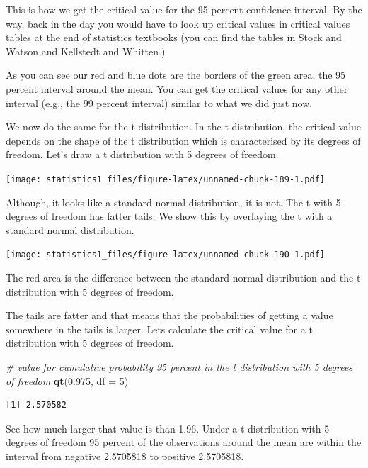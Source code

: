 \documentclass[]{article}
\newenvironment{Shaded}{\begin{snugshade}}{\end{snugshade}}
\newcommand{\KeywordTok}[1]{\textcolor[rgb]{0.13,0.29,0.53}{\textbf{#1}}}
\newcommand{\DataTypeTok}[1]{\textcolor[rgb]{0.13,0.29,0.53}{#1}}
\newcommand{\DecValTok}[1]{\textcolor[rgb]{0.00,0.00,0.81}{#1}}
\newcommand{\FloatTok}[1]{\textcolor[rgb]{0.00,0.00,0.81}{#1}}
\newcommand{\CommentTok}[1]{\textcolor[rgb]{0.56,0.35,0.01}{\textit{#1}}}
\newcommand{\NormalTok}[1]{#1}
\theoremstyle{definition}
\theoremstyle{definition}
\theoremstyle{definition}
\theoremstyle{remark}
\begin{document}
This is how we get the critical value for the 95 percent confidence
interval. By the way, back in the day you would have to look up critical
values in critical values tables at the end of statistics textbooks (you
can find the tables in Stock and Watson and Kellstedt and Whitten.)

As you can see our red and blue dots are the borders of the green area,
the 95 percent interval around the mean. You can get the critical values
for any other interval (e.g., the 99 percent interval) similar to what
we did just now.

We now do the same for the t distribution. In the t distribution, the
critical value depends on the shape of the t distribution which is
characterised by its degrees of freedom. Let's draw a t distribution
with 5 degrees of freedom.

\texttt{[image: statistics1\_files/figure-latex/unnamed-chunk-189-1.pdf]}

Although, it looks like a standard normal distribution, it is not. The t
with 5 degrees of freedom has fatter tails. We show this by overlaying
the t with a standard normal distribution.

\texttt{[image: statistics1\_files/figure-latex/unnamed-chunk-190-1.pdf]}

The red area is the difference between the standard normal distribution
and the t distribution with 5 degrees of freedom.

The tails are fatter and that means that the probabilities of getting a
value somewhere in the tails is larger. Lets calculate the critical
value for a t distribution with 5 degrees of freedom.

\begin{Shaded}
\begin{Highlighting}[]
\CommentTok{# value for cumulative probability 95 percent in the t distribution with 5 degrees of freedom}
\KeywordTok{qt}\NormalTok{(}\FloatTok{0.975}\NormalTok{, }\DataTypeTok{df =} \DecValTok{5}\NormalTok{)}
\end{Highlighting}
\end{Shaded}

\begin{verbatim}
[1] 2.570582
\end{verbatim}

See how much larger that value is than 1.96. Under a t distribution with
5 degrees of freedom 95 percent of the observations around the mean are
within the interval from negative 2.5705818 to positive 2.5705818.
\end{document}
